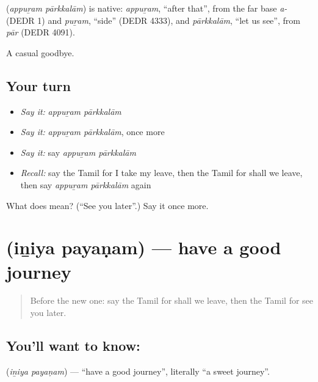 \begin{cousinweb}
\textbf{ } (\emph{appuṟam pārkkalām}) is native: \emph{appuṟam}, \textquotedblleft{}after that\textquotedblright{}, from the far base \emph{a-} (DEDR 1) and \emph{puṟam}, \textquotedblleft{}side\textquotedblright{} (DEDR 4333), and \emph{pārkkalām}, \textquotedblleft{}let us see\textquotedblright{}, from \emph{pār} (DEDR 4091).
\end{cousinweb}

\begin{grammarlens}[title={What you've built}]
A casual goodbye.
\end{grammarlens}

\subsection*{Your turn}
\begin{itemize}
\raggedright
  \item \emph{Say it:} \emph{appuṟam pārkkalām}
  \item \emph{Say it:} \emph{appuṟam pārkkalām}, once more
  \item \emph{Say it:} say \emph{appuṟam pārkkalām}
  \item \emph{Recall:} say the Tamil for I take my leave, then the Tamil for shall we leave, then say \emph{appuṟam pārkkalām} again
\end{itemize}

\begin{tcolorbox}[breakable,colback=teal!4,colframe=teal!35!black,title={Before you move on}]
What does   mean? (\textquotedblleft{}See you later\textquotedblright{}.) Say it once more.
\end{tcolorbox}
\section[\texorpdfstring{\ta{இனிய} \ta{பயணம்} (iṉiya payaṇam)}{இனிய பயணம் (iṉiya payaṇam)}]{  (iṉiya payaṇam) — have a good journey}

\label{lesson:TA-C107-goodjourney}



\begin{quote}
Before the new one: say the Tamil for shall we leave, then the Tamil for see you later.
\end{quote}

\subsection*{You'll want to know:  }
\textbf{ } (\emph{iṉiya payaṇam}) — \textquotedblleft{}have a good journey\textquotedblright{}, literally \textquotedblleft{}a sweet journey\textquotedblright{}.

